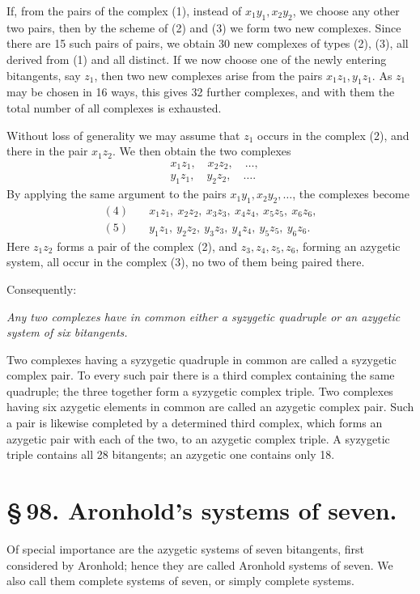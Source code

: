\documentclass[11pt]{article}
\begin{document}
If, from the pairs of the complex (1), instead of \(x_1y_1,x_2y_2\), we choose any other two pairs, then by the scheme of (2) and (3) we form two new complexes. Since there are 15 such pairs of pairs, we obtain 30 new complexes of types (2), (3), all derived from (1) and all distinct. If we now choose one of the newly entering bitangents, say \(z_1\), then two new complexes arise from the pairs \(x_1z_1,y_1z_1\). As \(z_1\) may be chosen in 16 ways, this gives 32 further complexes, and with them the total number of all complexes is exhausted.

Without loss of generality we may assume that \(z_1\) occurs in the complex (2), and there in the pair \(x_1z_2\). We then obtain the two complexes
\begin{align}
&x_1z_1,\quad x_2z_2,\quad \ldots, \tag{4}\\
&y_1z_1,\quad y_2z_2,\quad \ldots. \tag{5}
\end{align}
By applying the same argument to the pairs \(x_1y_1,x_2y_2,\ldots\), the complexes become
\begin{align*}
(4)&\quad x_1z_1,\ x_2z_2,\ x_3z_3,\ x_4z_4,\ x_5z_5,\ x_6z_6,\\
(5)&\quad y_1z_1,\ y_2z_2,\ y_3z_3,\ y_4z_4,\ y_5z_5,\ y_6z_6.
\end{align*}
Here \(z_1z_2\) forms a pair of the complex (2), and \(z_3,z_4,z_5,z_6\), forming an azygetic system, all occur in the complex (3), no two of them being paired there.

Consequently:

\emph{Any two complexes have in common either a syzygetic quadruple or an azygetic system of six bitangents.}

Two complexes having a syzygetic quadruple in common are called a syzygetic complex pair. To every such pair there is a third complex containing the same quadruple; the three together form a syzygetic complex triple. Two complexes having six azygetic elements in common are called an azygetic complex pair. Such a pair is likewise completed by a determined third complex, which forms an azygetic pair with each of the two, to an azygetic complex triple. A syzygetic triple contains all 28 bitangents; an azygetic one contains only 18.

\section*{\S\,98. Aronhold's systems of seven.}

Of special importance are the azygetic systems of seven bitangents, first considered by Aronhold; hence they are called Aronhold systems of seven. We also call them complete systems of seven, or simply complete systems.
\end{document}
